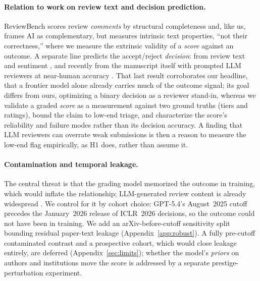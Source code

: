 \paragraph{Relation to work on review text and decision prediction.}
ReviewBench \citep{reviewbench2026} scores review \emph{comments} by structural
completeness and, like us, frames AI as complementary, but measures intrinsic text
properties, ``not their correctness,'' where we measure the extrinsic validity of a
\emph{score} against an outcome. A separate line predicts the accept/reject
\emph{decision}: from review text and sentiment
\citep{wang2018sentiment,ghosal2019deepsentipeer,kang2018peerread,jung2025whatdrives},
and recently from the manuscript itself with prompted LLM reviewers at near-human accuracy
\citep{reviewertoo2025}. That last result corroborates our headline, that a frontier model
alone already carries much of the outcome signal; its goal differs from ours, optimizing a
binary decision as a reviewer stand-in, whereas we validate a graded \emph{score} as a
measurement against two ground truths (tiers and ratings), bound the claim to low-end
triage, and characterize the score's reliability and failure modes rather than its
decision accuracy. A finding that LLM reviewers can overrate weak submissions
\citep{li2026llmreviewer} is then a reason to measure the low-end flag empirically, as H1
does, rather than assume it.

\paragraph{Contamination and temporal leakage.}
The central threat is that the grading model memorized the outcome in training, which
would inflate the relationship; LLM-generated review content is already widespread
\citep{liang2024monitoring}. We control for it by cohort choice: GPT-5.4's August~2025
cutoff \citep{openai2026gpt54} precedes the January~2026 release of ICLR~2026 decisions,
so the outcome could not have been in training. We add an arXiv-before-cutoff sensitivity split bounding residual
paper-text leakage (Appendix~\ref{app:robust}). A fully pre-cutoff contaminated contrast
and a prospective cohort, which would close leakage entirely, are deferred
(Appendix~\ref{sec:limits}); whether the model's \emph{priors} on authors and
institutions move the score is addressed by a separate prestige-perturbation experiment.

